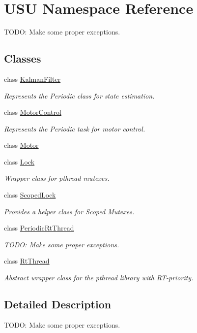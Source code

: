 \hypertarget{namespace_u_s_u}{\section{\-U\-S\-U \-Namespace \-Reference}
\label{namespace_u_s_u}
}


\-T\-O\-D\-O\-: \-Make some proper exceptions.  


\subsection*{\-Classes}
\begin{DoxyCompactItemize}
\item 
class \hyperlink{class_u_s_u_1_1_kalman_filter}{\-Kalman\-Filter}
\begin{DoxyCompactList}\small\item\em \-Represents the \-Periodic class for state estimation. \end{DoxyCompactList}\item 
class \hyperlink{class_u_s_u_1_1_motor_control}{\-Motor\-Control}
\begin{DoxyCompactList}\small\item\em \-Represents the \-Periodic task for motor control. \end{DoxyCompactList}\item 
class \hyperlink{class_u_s_u_1_1_motor}{\-Motor}
\item 
class \hyperlink{class_u_s_u_1_1_lock}{\-Lock}
\begin{DoxyCompactList}\small\item\em \-Wrapper class for pthread mutexes. \end{DoxyCompactList}\item 
class \hyperlink{class_u_s_u_1_1_scoped_lock}{\-Scoped\-Lock}
\begin{DoxyCompactList}\small\item\em \-Provides a helper class for \-Scoped \-Mutexes. \end{DoxyCompactList}\item 
class \hyperlink{class_u_s_u_1_1_periodic_rt_thread}{\-Periodic\-Rt\-Thread}
\begin{DoxyCompactList}\small\item\em \-T\-O\-D\-O\-: \-Make some proper exceptions. \end{DoxyCompactList}\item 
class \hyperlink{class_u_s_u_1_1_rt_thread}{\-Rt\-Thread}
\begin{DoxyCompactList}\small\item\em \-Abstract wrapper class for the pthread library with \-R\-T-\/priority. \end{DoxyCompactList}\end{DoxyCompactItemize}


\subsection{\-Detailed \-Description}
\-T\-O\-D\-O\-: \-Make some proper exceptions. 